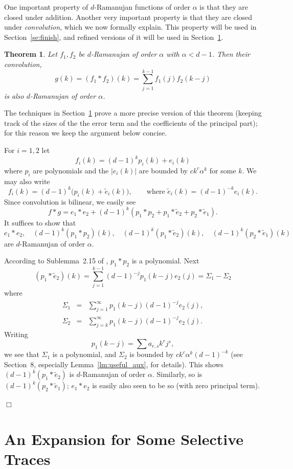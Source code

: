 \documentclass[12pt]{article}
\newtheorem{theorem}{Theorem}[section]
\newcommand{\dtreelike}{{$d$-Ramanujan}}
\newcommand{\proof}{{\par\noindent {\bf Proof}\space\space}}
\newcommand{\proofbox}{\begin{flushright}$\Box$\end{flushright}}
\begin{document}
One important property of {\dtreelike} functions of order $\alpha$
is that they are closed under addition.  Another very important
property is that they are closed under {\em convolution}, which we
now formally explain.
This property
will be used in Section~\ref{se:finish}, and
refined versions of it will be used in Section~\ref{se:expansion}.
\begin{theorem}\label{th:baby_convolute}
Let $f_1,f_2$ be {\dtreelike} of order $\alpha$ with $\alpha<d-1$.  
Then their convolution,
$$
g(k)= (f_1*f_2)(k) = \sum_{j=1}^{k-1} f_1(j)f_2(k-j)
$$
is also {\dtreelike} of order $\alpha$.
\end{theorem}
The techniques in
Section~\ref{se:expansion} prove a more precise version of this
theorem (keeping track of the sizes of the
the error term and the coefficients of the principal part); for this
reason we keep the argument below concise.
\proof 
For $i=1,2$ let
$$
f_i(k) = (d-1)^k p_i(k) + e_i(k)
$$
where $p_i$ are polynomials and the $|e_i(k)|$ are bounded
by $ck^c\alpha^k$ for some $k$.  We may also write
$$
f_i(k) = (d-1)^k\bigl(p_i(k)+\tilde e_i(k)\bigr), \qquad
\mbox{where $\tilde e_i(k)=(d-1)^{-k}e_i(k)$.}
$$
Since convolution is bilinear, we easily see
$$
f*g= e_1*e_2+(d-1)^k(p_1*p_2 + p_1*\tilde e_2 + p_2*\tilde e_1).
$$
It suffices to show that 
$$
e_1*e_2,\quad (d-1)^k(p_1*p_2)(k), \quad (d-1)^k(p_1*\tilde e_2)(k),
\quad (d-1)^k(p_2*\tilde e_1)(k)
$$
are {\dtreelike} of order $\alpha$.

According to Sublemma~2.15 of \cite{friedman_random_graphs},
$p_1*p_2$ is a polynomial.  Next
$$
(p_1*\tilde e_2)(k)=\sum_{j=1}^{k-1} (d-1)^{-j} p_1(k-j)e_2(j)
= \Sigma_1-\Sigma_2
$$
where
\begin{eqnarray*}
\Sigma_1& =& \sum_{j=1}^\infty p_1(k-j)(d-1)^{-j}e_2(j),\\
\Sigma_2 &=& \sum_{j=k}^\infty p_1(k-j)(d-1)^{-j}e_2(j).
\end{eqnarray*}
Writing 
$$
p_1(k-j) = \sum a_{r,s} k^r j^s,
$$
we see that
$\Sigma_1$ is a polynomial, and $\Sigma_2$ is bounded by
$ck^c\alpha^k(d-1)^{-k}$ (see Section~8, especially Lemma~\ref{lm:useful_aux},
for details).
This shows $(d-1)^k(p_1*\tilde e_2)$ is {\dtreelike} of order $\alpha$.
Similarly, so is $(d-1)^k(p_2*\tilde e_1)$; $e_1*e_2$ is easily also seen
to be so (with zero principal term).
\proofbox


\section{An Expansion for Some Selective Traces}
\label{se:expansion}
\end{document}
